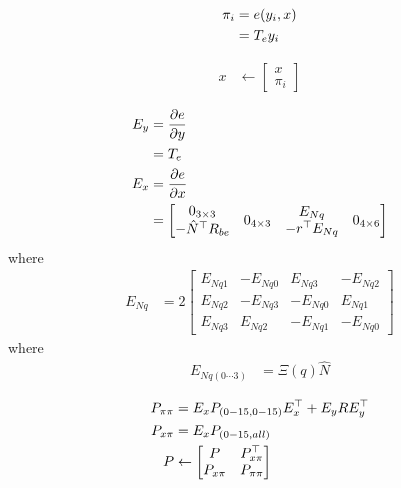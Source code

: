 \documentclass[]{article}
\begin{document}
{\begin{align}
	\pi_i	&= e(y_i,x) \notag \\
			&= T_e y_i
\end{align}

\begin{align}
	x &\leftarrow
	\left[
	\begin{matrix}
		x \\
		\pi_i
	\end{matrix}
	\right]
\end{align}

\begin{align}
	E_y &= \frac{\partial e}{\partial y} \notag \\
		&= T_e \\
	E_x &= \frac{\partial e}{\partial x} \notag \\
		&=
	\left[
	\begin{matrix}
		\begin{matrix}
			0_{3 \times 3} \\
			-\hat{N}^\top R_{be}
		\end{matrix}
		&
		0_{4 \times 3}
		&
		\begin{matrix}
			E_{Nq} \\
			-r^\top E_{Nq}
		\end{matrix}
		&
		0_{4 \times 6}
	\end{matrix}
	\right]
\end{align}
where
\begin{align}
	E_{Nq} 	&= 2
	\left[
	\begin{matrix}
		E_{Nq1} 	& -E_{Nq0} 	& E_{Nq3} 	& -E_{Nq2} \\
		E_{Nq2} 	& -E_{Nq3} 	& -E_{Nq0} 	& E_{Nq1} \\
		E_{Nq3} 	& E_{Nq2} 	& -E_{Nq1} 	& -E_{Nq0}
	\end{matrix}
	\right]
\end{align}
where
\begin{align}
	E_{Nq(0\cdots3)} &= \Xi(q) \hat{N}
\end{align}

\begin{align}
	P_{\pi \pi} &= E_x P_{(0-15,0-15)} E_x^\top + E_y R E_y^\top \notag \\
	P_{x \pi} 	&= E_x P_{(0-15,all)} \notag \\
	P &\leftarrow
	\left[
	\begin{matrix}
		P 			& P_{x \pi}^\top \\
		P_{x \pi}	& P_{\pi \pi}
	\end{matrix}
	\right]
\end{align}

}
\end{document}

